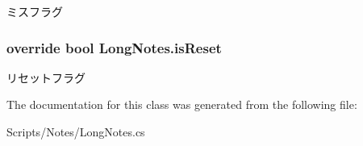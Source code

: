 ミスフラグ 

\subsubsection[{\texorpdfstring{is\+Reset}{isReset}}]{\setlength{\rightskip}{0pt plus 5cm}override bool Long\+Notes.\+is\+Reset\hspace{0.3cm}{\ttfamily [get]}}\hypertarget{class_long_notes_a958688f3d3eaca0f9fffaa3fab9b6fd8}{}\label{class_long_notes_a958688f3d3eaca0f9fffaa3fab9b6fd8}


リセットフラグ 



The documentation for this class was generated from the following file\+:\begin{DoxyCompactItemize}
\item 
Scripts/\+Notes/Long\+Notes.\+cs\end{DoxyCompactItemize}
